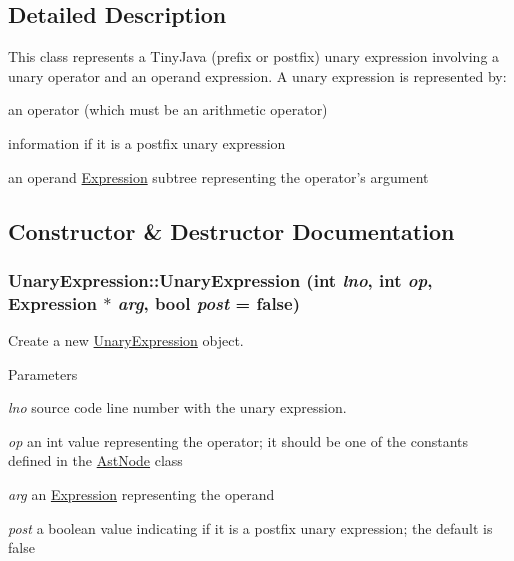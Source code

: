 \subsection{Detailed Description}
This class represents a TinyJava (prefix or postfix) unary expression involving a unary operator and an operand expression. A unary expression is represented by:
\begin{DoxyItemize}
\item an operator (which must be an arithmetic operator)
\item information if it is a postfix unary expression
\item an operand \hyperlink{classExpression}{Expression} subtree representing the operator's argument 
\end{DoxyItemize}

\subsection{Constructor \& Destructor Documentation}
\hypertarget{classUnaryExpression_a03b712bd21c8ec768ae8bdd95ef325f0}{
\subsubsection[{UnaryExpression}]{\setlength{\rightskip}{0pt plus 5cm}UnaryExpression::UnaryExpression (int {\em lno}, \/  int {\em op}, \/  {\bf Expression} $\ast$ {\em arg}, \/  bool {\em post} = {\ttfamily false})}}
\label{classUnaryExpression_a03b712bd21c8ec768ae8bdd95ef325f0}
Create a new \hyperlink{classUnaryExpression}{UnaryExpression} object.


\begin{DoxyParams}{Parameters}
\item[{\em lno}]source code line number with the unary expression. \item[{\em op}]an int value representing the operator; it should be one of the constants defined in the \hyperlink{classAstNode}{AstNode} class \item[{\em arg}]an \hyperlink{classExpression}{Expression} representing the operand \item[{\em post}]a boolean value indicating if it is a postfix unary expression; the default is false \end{DoxyParams}

